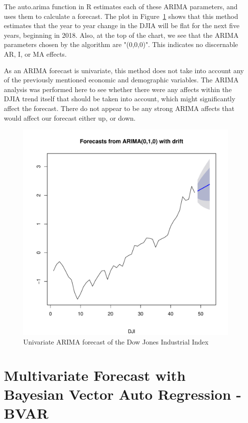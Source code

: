 \documentclass[12pt]{article}         %
\begin{document}
The auto.arima function in R estimates each of these ARIMA parameters, and uses them to calculate a forecast.  The plot in Figure~\ref{fig:ArimaDJI} shows that this method estimates that the year to year change in the DJIA will be flat for the next five years, beginning in 2018.  Also, at the top of the chart, we see that the ARIMA parameters chosen by the algorithm are "(0,0,0)".  This indicates no discernable AR, I, or MA effects. 

As an ARIMA forecast is univariate, this method does not take into account any of the previously mentioned economic and demographic variables.  The ARIMA analysis was performed here to see whether there were any affects within the DJIA trend itself that should be taken into account, which might significantly affect the forecast.  There do not appear to be any strong ARIMA affects that would affect our forecast either up, or down.

\begin{figure}[h!]
\begin{center}
\includegraphics[width=\linewidth]{plots/DJI_arima_yrly.pdf}
\caption{Univariate ARIMA forecast of the Dow Jones Industrial Index}
\label{fig:ArimaDJI}
\end{center}
\end{figure}


\section{Multivariate Forecast with Bayesian Vector Auto Regression - BVAR}
\end{document}
